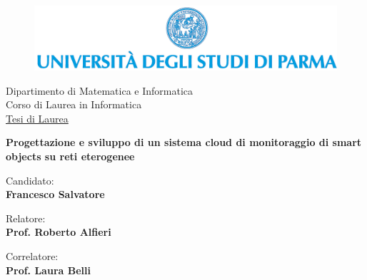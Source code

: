 \begin{titlepage}
  \hypersetup{pageanchor=false}

  \begin{center}
    \medskip

    \begin{figure}
      \centering
      \includegraphics[scale=0.52]{logouni.png}
    \end{figure}


    \begin{Large}
      Dipartimento di Matematica e Informatica \\
      \medskip
      Corso di Laurea in Informatica \\
      \medskip
      \underline{Tesi di Laurea} \\
      \vspace{2.0cm}
      
      \begin{huge}
        \textbf{Progettazione e sviluppo di un sistema cloud di monitoraggio di smart objects su reti eterogenee} \\
      \end{huge}
      
      \vspace{2.0cm}
      
      
		  \begin{flushleft}
		    Candidato: \\
		    \textbf{Francesco Salvatore} \\
		  \end{flushleft}
	  \vspace{1.0cm}
	  
	  \begin{minipage}{.45\linewidth}
		  \begin{flushleft}
		    {\small Relatore:} \\
		    \textbf{\small{Prof. Roberto Alfieri}}
		  \end{flushleft}
	  \end{minipage}
	  \hfill
	  \begin{minipage}{.45\linewidth}
		  \begin{flushright}
		    {\small Correlatore:} \\
		    \textbf{\small{Prof. Laura Belli}}
		  \end{flushright}
	   \end{minipage}
      

\end{Large}
\end{center}
\end{titlepage}
